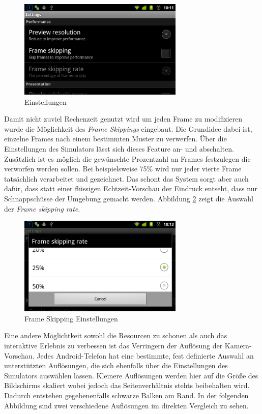 \documentclass[a4paper]{article}
\begin{document}
\begin{figure}[H]
\centering
\includegraphics[width=0.7\textwidth, trim=0 0 0 39, clip=true]{settings-landscape.png}
\caption{Einstellungen}
\label{settings}
\end{figure}

Damit nicht zuviel Rechenzeit genutzt wird um jeden Frame zu modifizieren wurde die Möglichkeit des \textit{Frame Skippings} eingebaut. Die Grundidee dabei ist, einzelne Frames nach einem bestimmten Muster zu verwerfen. Über die Einstellungen des Simulators lässt sich dieses Feature an- und abschalten. Zusätzlich ist es möglich die gewünschte Prozentzahl an Frames festzulegen die verworfen werden sollen. Bei beispielsweise 75\% wird nur jeder vierte Frame tatsächlich verarbeitet und gezeichnet. Das schont das System sorgt aber auch dafür, dass statt einer flüssigen Echtzeit-Vorschau der Eindruck entseht, dass nur Schnappschüsse der Umgebung gemacht werden. Abbildung \ref{skiprate} zeigt die Auswahl der \textit{Frame skipping rate}.

\begin{figure}[H]
\centering
\includegraphics[width=0.7\textwidth, trim=0 0 0 39, clip=true]{skiprate-landscape.png}
\caption{Frame Skipping Einstellungen}
\label{skiprate}
\end{figure}

\newpage

Eine andere Möglichtkeit sowohl die Resourcen zu schonen als auch das interaktive Erlebnis zu verbessen ist das Verringern der Auflösung der Kamera-Vorschau. Jedes Android-Telefon hat eine bestimmte, fest definierte Auswahl an unterstützten Auflösungen, die sich ebenfalls über die Einstellungen des Simulators auswählen lassen. Kleinere Auflösungen werden hier auf die Größe des Bildschirms skaliert wobei jedoch das Seitenverhältnis stehts beibehalten wird. Dadurch entstehen gegebenenfalls schwarze Balken am Rand. In der folgenden Abbildung sind zwei verschiedene Auflösungen im direkten Vergleich zu sehen.
\end{document}
